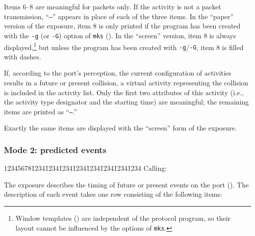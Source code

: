 Items 6--8 are meaningful for packets only.
If the activity is not a packet transmission, ``{\tt ---}''
appears in place of each of the three items.
In the ``paper'' version of the exposure, item 8 is only printed if the
program has been created with the {\tt -g} (or {\tt -G}) option of {\tt mks}
().
In the ``screen'' version, item 8 is always
displayed,\footnote{Window templates ()
are independent of the protocol program, so their
layout cannot be influenced by the options of {\tt mks}.}
but unless the program has been created with {\tt -g}/{\tt -G},
item 8 is filled with dashes.

If, according to the port's perception, the current configuration of activities
results in a future or present collision, a virtual activity representing
the collision is included in the activity list.
Only the first two attributes of this activity (i.e., the activity type
designator and the starting time) are meaningful; the remaining items are
printed as ``{\tt ---}.''

Exactly the same items are displayed with the ``screen''
form of the exposure.

\subsubsection*{Mode 2: predicted events}

{\tt\begin{tabbing}
12345678\=1234\=1234\=1234\=1234\=1234\=1234\=1234\=1234\kill
{\rm Calling:}
\end{tabbing}}

The exposure describes the timing of future or present events on the port
().
The description of each event takes one row consisting of the following
items:

